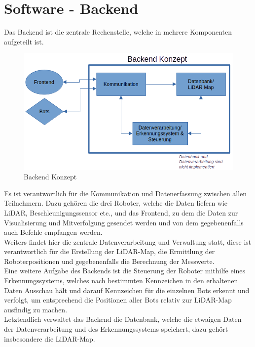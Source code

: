 

\chapter{Software - Backend}
\label{sec:software_backend}
Das Backend ist die zentrale Rechenstelle, 
welche in mehrere Komponenten aufgeteilt ist.

\begin{figure}[H]
    \includegraphics[width=\textwidth, center]{img/backend-konzept.png}
    \caption{Backend Konzept}
    \label{fig:backend_konzept}
\end{figure}

Es ist verantwortlich für die Kommunikation und Datenerfassung 
zwischen allen Teilnehmern. 
Dazu gehören die drei Roboter, welche die Daten liefern wie LiDAR, 
Beschleunigungssensor etc., und das Frontend, 
zu dem die Daten zur Visualisierung und Mitverfolgung gesendet werden 
und von dem gegebenenfalls auch Befehle empfangen werden.
\\
Weiters findet hier die zentrale Datenverarbeitung und Verwaltung statt, 
diese ist verantwortlich für die Erstellung der LiDAR-Map, 
die Ermittlung der Roboterpositionen und gegebenenfalls die Berechnung der Messwerte. 
\\
Eine weitere Aufgabe des Backends 
ist die Steuerung der Roboter mithilfe eines Erkennungssystems, 
welches nach bestimmten Kennzeichen in den erhaltenen Daten Ausschau hält 
und darauf Kennzeichen für die einzelnen Bots erkennt und verfolgt, 
um entsprechend die Positionen aller Bots relativ zur LiDAR-Map ausfindig zu machen.
% 
\\
Letztendlich verwaltet das Backend die Datenbank, 
welche die etwaigen Daten der Datenverarbeitung und des Erkennungssystems speichert, 
dazu gehört insbesondere die LiDAR-Map.

